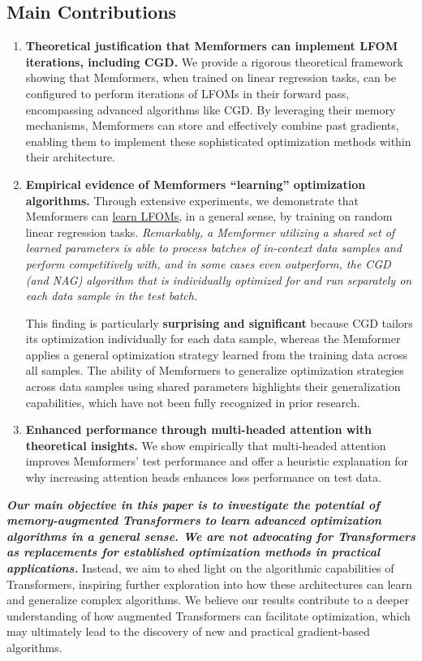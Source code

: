\documentclass[11pt]{article}
\numberwithin{equation}{section}
\begin{document}
\subsection*{Main Contributions}
\begin{enumerate}[label=(\arabic*),leftmargin=3em]
    \item \textbf{Theoretical justification that Memformers can implement LFOM iterations, including CGD.} We provide a rigorous theoretical framework showing that Memformers, when trained on linear regression tasks, can be configured to perform iterations of LFOMs in their forward pass, encompassing advanced algorithms like CGD. By leveraging their memory mechanisms, Memformers can store and effectively combine past gradients, enabling them to implement these sophisticated optimization methods within their architecture.

    \item \textbf{Empirical evidence of Memformers ``learning'' optimization algorithms.} Through extensive experiments, we demonstrate that Memformers can \underline{learn LFOMs}, in a general sense, by training on random linear regression tasks. \textit{Remarkably, a Memformer utilizing a shared set of learned parameters is able to process batches of in-context data samples and perform competitively with, and in some cases even outperform, the CGD (and NAG) algorithm that is individually optimized for and run separately on each data sample in the test batch.}

    This finding is particularly \textbf{surprising and significant} because CGD tailors its optimization individually for each data sample, whereas the Memformer applies a general optimization strategy learned from the training data across all samples. The ability of Memformers to generalize optimization strategies across data samples using shared parameters highlights their generalization capabilities, which have not been fully recognized in prior research.

    \item \textbf{Enhanced performance through multi-headed attention with theoretical insights.} We show empirically that multi-headed attention improves Memformers' test performance and offer a heuristic explanation for why increasing attention heads enhances loss performance on test data.
\end{enumerate}

\textbf{\textit{Our main objective in this paper is to investigate the potential of memory-augmented Transformers to learn advanced optimization algorithms in a general sense. We are not advocating for Transformers as replacements for established optimization methods in practical applications.}} Instead, we aim to shed light on the algorithmic capabilities of Transformers, inspiring further exploration into how these architectures can learn and generalize complex algorithms. We believe our results contribute to a deeper understanding of how augmented Transformers can facilitate optimization, which may ultimately lead to the discovery of new and practical gradient-based algorithms.
\end{document}
